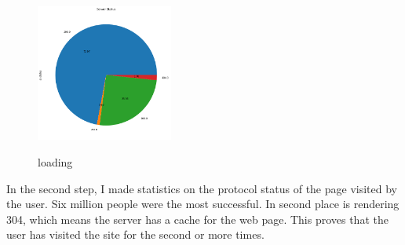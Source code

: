 \begin{figure}
	\centering
	\includegraphics[width=0.4\textwidth]{ll2.png}\\
	\caption{loading}\label{fig:loading}
\end{figure}
In the second step, I made statistics on the protocol status of the page visited by the user.
Six million people were the most successful.
In second place is rendering 304, which means the server has a cache for the web page.
This proves that the user has visited the site for the second or more times.


